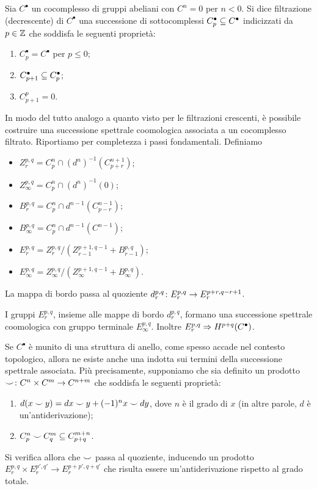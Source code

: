 \begin{definition}
Sia $C^\bullet$ un cocomplesso di gruppi abeliani con $C^n=0$ per $n<0$. Si dice filtrazione (decrescente) di $C^\bullet$ una successione di sottocomplessi $C_p^\bullet\subseteq C^\bullet$ indicizzati da $p\in\mathbb{Z}$ che soddisfa le seguenti proprietà:
\begin{enumerate}
\item $C_p^\bullet=C^\bullet$ per $p\le 0$;
\item $C_{p+1}^\bullet\subseteq C_p^\bullet$;
\item $C^p_{p+1}=0$.
\end{enumerate}
\end{definition}
In modo del tutto analogo a quanto visto per le filtrazioni crescenti, è possibile costruire una successione spettrale coomologica associata a un cocomplesso filtrato. Riportiamo per completezza i passi fondamentali. Definiamo
\begin{itemize}
\item $Z^{p,q}_r=C_p^n\cap (d^n)^{-1}(C_{p+r}^{n+1})$;
\item $Z^{p,q}_\infty=C_p^n\cap(d^n)^{-1}(0)$;
\item $B^{p,q}_r=C_p^n\cap d^{n-1}(C_{p-r}^{n-1})$;
\item $B^{p,q}_\infty=C_p^n\cap d^{n-1}(C^{n-1})$;
\item $E^{p,q}_r=Z^{p,q}_r/(Z^{p+1,q-1}_{r-1}+B^{p,q}_{r-1})$;
\item $E^{p,q}_\infty=Z^{p,q}_\infty/(Z^{p+1,q-1}_{\infty}+B^{p,q}_\infty)$.
\end{itemize}
La mappa di bordo passa al quoziente $d^{p,q}_r\colon E^{p,q}_r\to E^{p+r,q-r+1}_r$.
\begin{proposition}
I gruppi $E^{p,q}_r$, insieme alle mappe di bordo $d^{p,q}_r$, formano una successione spettrale coomologica con gruppo terminale $E^{p,q}_\infty$. Inoltre $E^{p,q}_r\Rightarrow H^{p+q}(C^\bullet)$.
\end{proposition}
Se $C^\bullet$ è munito di una struttura di anello, come spesso accade nel contesto topologico, allora ne esiste anche una indotta sui termini della successione spettrale associata. Più precisamente, supponiamo che sia definito un prodotto $\mathbin{\smile}\colon C^n\times C^m\to C^{n+m}$ che soddisfa le seguenti proprietà:
\begin{enumerate}
\item $d(x\mathbin{\smile} y)=dx\mathbin{\smile} y+(-1)^nx\mathbin{\smile} dy$, dove $n$ è il grado di $x$ (in altre parole, $d$ è un'antiderivazione);
\item $C^n_p\mathbin{\smile} C^m_q\subseteq C^{m+n}_{p+q}$.
\end{enumerate}
Si verifica  allora che $\mathbin{\smile}$ passa al quoziente, inducendo un prodotto $E^{p,q}_r\times E^{p',q'}_r\to E^{p+p',q+q'}_r$ che risulta essere un'antiderivazione rispetto al grado totale.

